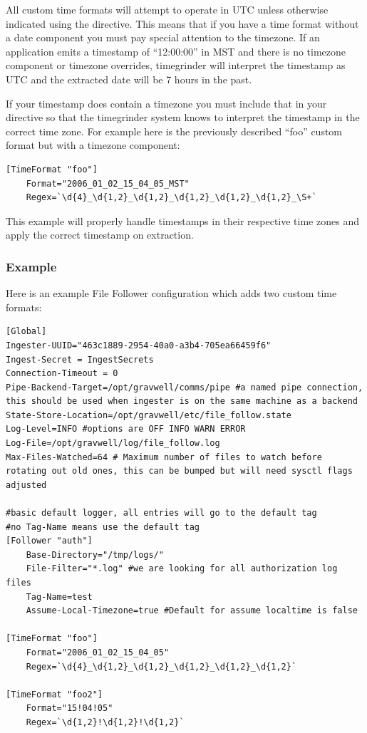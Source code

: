 All custom time formats will attempt to operate in UTC unless otherwise indicated using the  directive.  This means that if you have a time format without a date component you must pay special attention to the timezone.  If an application emits a timestamp of ``12:00:00'' in MST and there is no timezone component or timezone overrides, timegrinder will interpret the timestamp as UTC and the extracted date will be 7 hours in the past.

If your timestamp does contain a timezone you must include that in your  directive so that the timegrinder system knows to interpret the timestamp in the correct time zone.  For example here is the previously described ``foo'' custom format but with a timezone component:

\begin{verbatim}
[TimeFormat "foo"]
	Format="2006_01_02_15_04_05_MST"
	Regex=`\d{4}_\d{1,2}_\d{1,2}_\d{1,2}_\d{1,2}_\d{1,2}_\S+`
\end{verbatim}

This example will properly handle timestamps in their respective time zones and apply the correct timestamp on extraction.

\subsubsection{Example}

Here is an example File Follower configuration which adds two custom time formats:

\begin{verbatim}
[Global]
Ingester-UUID="463c1889-2954-40a0-a3b4-705ea66459f6"
Ingest-Secret = IngestSecrets
Connection-Timeout = 0
Pipe-Backend-Target=/opt/gravwell/comms/pipe #a named pipe connection, this should be used when ingester is on the same machine as a backend
State-Store-Location=/opt/gravwell/etc/file_follow.state
Log-Level=INFO #options are OFF INFO WARN ERROR
Log-File=/opt/gravwell/log/file_follow.log
Max-Files-Watched=64 # Maximum number of files to watch before rotating out old ones, this can be bumped but will need sysctl flags adjusted

#basic default logger, all entries will go to the default tag
#no Tag-Name means use the default tag
[Follower "auth"]
	Base-Directory="/tmp/logs/"
	File-Filter="*.log" #we are looking for all authorization log files
	Tag-Name=test
	Assume-Local-Timezone=true #Default for assume localtime is false

[TimeFormat "foo"]
	Format="2006_01_02_15_04_05"
	Regex=`\d{4}_\d{1,2}_\d{1,2}_\d{1,2}_\d{1,2}_\d{1,2}`

[TimeFormat "foo2"]
	Format="15!04!05"
	Regex=`\d{1,2}!\d{1,2}!\d{1,2}`
\end{verbatim}

